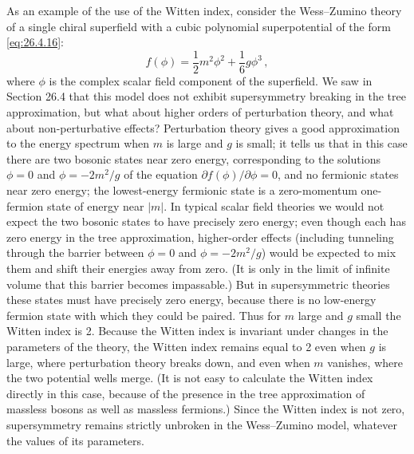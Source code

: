 As an example of the use of the Witten index, consider the Wess--Zumino
theory of a single chiral superfield with a cubic polynomial
superpotential of the form \eqref{eq:26.4.16}:
\[
  f(\phi)=\frac12m^2\phi^2+\frac16g\phi^3\,,
\]
where \(\phi\) is the complex scalar field component of the superfield.
We saw in Section 26.4 that this model does not exhibit supersymmetry
breaking in the tree approximation, but what about higher orders of
perturbation theory, and what about non-perturbative effects?
Perturbation theory gives a good approximation to the energy spectrum
when \(m\) is large and \(g\) is small; it tells us that in this case
there are two bosonic states near zero energy, corresponding to the
solutions \(\phi=0\) and \(\phi=-2m^2/g\) of the equation
\(\partial f(\phi)/\partial\phi=0\), and no fermionic states near zero
energy; the lowest-energy fermionic state is a zero-momentum one-fermion
state of energy near \(\lvert m\rvert\). In typical scalar field theories
we would not expect the two bosonic states to have precisely zero energy;
even though each has zero energy in the tree approximation, higher-order
effects (including tunneling through the barrier between \(\phi=0\) and
\(\phi=-2m^2/g\)) would be expected to mix them and shift their energies
away from zero. (It is only in the limit of infinite volume that this
barrier becomes impassable.) But in supersymmetric theories these states
must have precisely zero energy, because there is no low-energy fermion
state with which they could be paired. Thus for \(m\) large and \(g\)
small the Witten index is 2. Because the Witten index is invariant under
changes in the parameters of the theory, the Witten index remains equal
to 2 even when \(g\) is large, where perturbation theory breaks down, and
even when \(m\) vanishes, where the two potential wells merge. (It is not
easy to calculate the Witten index directly in this case, because of the
presence in the tree approximation of massless bosons as well as massless
fermions.) Since the Witten index is not zero, supersymmetry remains
strictly unbroken in the Wess--Zumino model, whatever the values of its
parameters.

